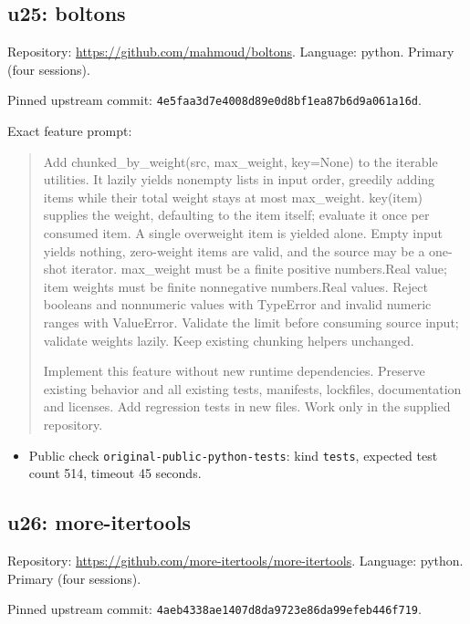 \documentclass[manuscript,screen,nonacm]{acmart}
\providecommand{\tightlist}{\setlength{\itemsep}{0pt}\setlength{\parskip}{0pt}}
\begin{document}
\subsection{u25: boltons}\label{u25-boltons}

Repository: \url{https://github.com/mahmoud/boltons}. Language: python.
Primary (four sessions).

Pinned upstream commit:
\nolinkurl{4e5faa3d7e4008d89e0d8bf1ea87b6d9a061a16d}.

Exact feature prompt:

\begin{quote}
Add chunked\_by\_weight(src, max\_weight, key=None) to the iterable
utilities. It lazily yields nonempty lists in input order, greedily
adding items while their total weight stays at most max\_weight.
key(item) supplies the weight, defaulting to the item itself; evaluate
it once per consumed item. A single overweight item is yielded alone.
Empty input yields nothing, zero-weight items are valid, and the source
may be a one-shot iterator. max\_weight must be a finite positive
numbers.Real value; item weights must be finite nonnegative numbers.Real
values. Reject booleans and nonnumeric values with TypeError and invalid
numeric ranges with ValueError. Validate the limit before consuming
source input; validate weights lazily. Keep existing chunking helpers
unchanged.

Implement this feature without new runtime dependencies. Preserve
existing behavior and all existing tests, manifests, lockfiles,
documentation and licenses. Add regression tests in new files. Work only
in the supplied repository.
\end{quote}

\begin{itemize}
\tightlist
\item
  Public check \nolinkurl{original-public-python-tests}: kind
  \texttt{tests}, expected test count 514, timeout 45 seconds.
\end{itemize}

\subsection{u26: more-itertools}\label{u26-more-itertools}

Repository: \url{https://github.com/more-itertools/more-itertools}.
Language: python. Primary (four sessions).

Pinned upstream commit:
\nolinkurl{4aeb4338ae1407d8da9723e86da99efeb446f719}.
\end{document}
